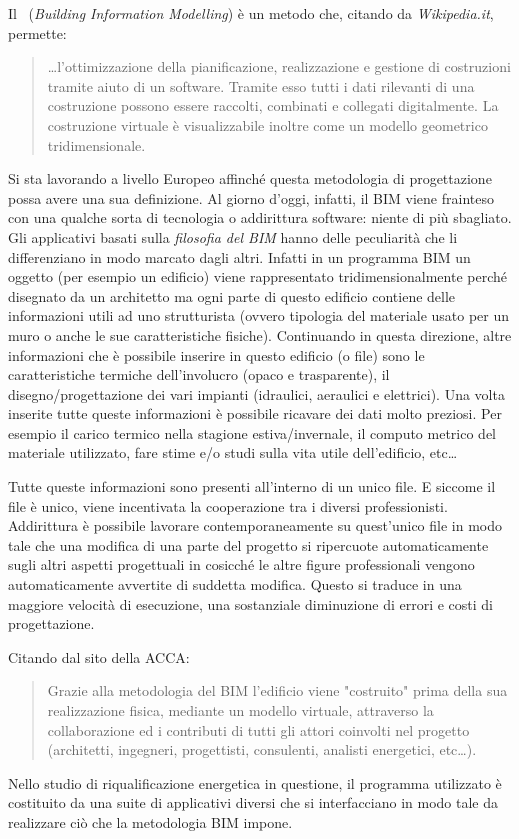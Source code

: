 Il \bim\ (\emph{Building Information Modelling}) è un metodo che, citando da \textit{Wikipedia.it}, permette:
\begin{quote}
	\dots l'ottimizzazione della pianificazione, realizzazione e gestione di costruzioni tramite aiuto di un software. Tramite esso tutti i dati rilevanti di una costruzione possono essere raccolti, combinati e collegati digitalmente. La costruzione virtuale è visualizzabile inoltre come un modello geometrico tridimensionale.%
\end{quote}
Si sta lavorando a livello Europeo affinché questa metodologia di progettazione possa avere una sua definizione. Al giorno d'oggi, infatti, il BIM viene frainteso con una qualche sorta di tecnologia o addirittura software: niente di più sbagliato. Gli applicativi basati sulla \emph{filosofia del BIM} hanno delle peculiarità che li differenziano in modo marcato dagli altri. Infatti in un programma BIM un oggetto (per esempio un edificio) viene rappresentato tridimensionalmente perché disegnato da un architetto ma ogni parte di questo edificio contiene delle informazioni utili ad uno strutturista (ovvero tipologia del materiale usato per un muro o anche le sue caratteristiche fisiche). Continuando in questa direzione, altre informazioni che è possibile inserire in questo edificio (o file) sono le caratteristiche termiche dell'involucro (opaco e trasparente), il disegno/progettazione dei vari impianti (idraulici, aeraulici e elettrici). Una volta inserite tutte queste informazioni è possibile ricavare dei dati molto preziosi. Per esempio il carico termico nella stagione estiva/invernale, il computo metrico del materiale utilizzato, fare stime e/o studi sulla vita utile dell'edificio, etc\dots

Tutte queste informazioni sono presenti all'interno di un unico file. E siccome il file è unico, viene incentivata la cooperazione tra i diversi professionisti. Addirittura è possibile lavorare contemporaneamente su quest'unico file in modo tale che una modifica di una parte del progetto si ripercuote automaticamente sugli altri aspetti progettuali in cosicché le altre figure professionali vengono automaticamente avvertite di suddetta modifica. Questo si traduce in una maggiore velocità di esecuzione, una sostanziale diminuzione di errori e costi di progettazione.

Citando dal sito della ACCA:
\begin{quote}
	Grazie alla metodologia del BIM l'edificio viene "costruito" prima della sua realizzazione fisica, mediante un modello virtuale, attraverso la collaborazione ed i contributi di tutti gli attori coinvolti nel progetto (architetti, ingegneri, progettisti, consulenti, analisti energetici, etc\dots).
\end{quote}
Nello studio di riqualificazione energetica in questione, il programma utilizzato è costituito da una suite di applicativi diversi che si interfacciano in modo tale da realizzare ciò che la metodologia BIM impone.


